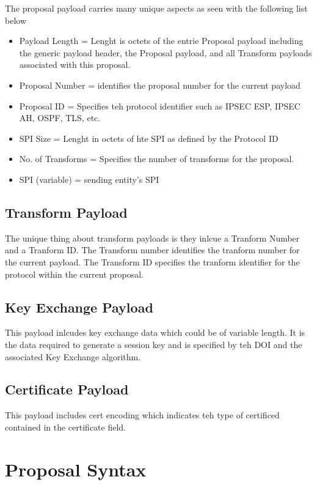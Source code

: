 \documentclass{article}
\begin{document}
The proposal payload carries many unique aspects as seen with the following list below

\begin{itemize}
\item Payload Length = Lenght is octets of the entrie Proposal payload including the generic payload header, the Proposal payload, and all Transform payloads associated with this proposal.
\item Proposal Number = identifies the proposal number for the current payload
\item Proposal ID = Specifies teh protocol identifier such as IPSEC ESP, IPSEC AH, OSPF, TLS, etc.
\item SPI Size = Lenght in octets of hte SPI as defined by the Protocol ID
\item No. of Transforms = Specifies the number of transforms for the proposal.
\item SPI (variable) = sending entity's SPI
\end{itemize}

\subsection {Transform Payload}

The unique thing about transform payloads is they inlcue a Tranform Number and a Tranform ID. The Transform number identifies the tranform number for the current payload. The Transform ID specifies the tranform identifier for the protocol within the current proposal. 

\subsection {Key Exchange Payload}

This payload inlcudes key exchange data which could be of variable length. It is the data required to generate a session key and is specified by teh DOI and the associated Key Exchange algorithm.

\subsection {Certificate Payload}

This payload includes cert encoding which indicates teh type of certificed contained in the certificate field. 

\section {Proposal Syntax}
\end{document}
